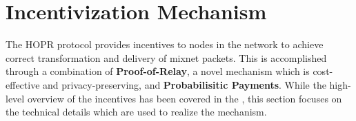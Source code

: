 \section{Incentivization Mechanism}
\label{sec:incentiviationmechanism}

The HOPR protocol provides incentives to nodes in the network to achieve correct
transformation and delivery of mixnet packets. This is accomplished through a
combination of \textbf{Proof-of-Relay}, a novel mechanism which is
cost-effective and privacy-preserving, and \textbf{Probabilisitic Payments}.
While the high-level overview of the incentives has been covered in the
, this section focuses on the technical details which
are used to realize the mechanism.






